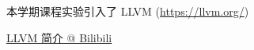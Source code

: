 \begin{frame}{}

  \begin{center}
    本学期课程实验引入了 LLVM (\url{https://llvm.org/})
  \end{center}
\end{frame}

\begin{frame}{}

  \vspace{0.20cm}
  \begin{center}
    \href{https://www.bilibili.com/video/BV1RF411K7F5/?vd_source=e3cbbf5ca80db268fa006d63626e267e}{LLVM 简介 @ Bilibili}
  \end{center}
\end{frame}
